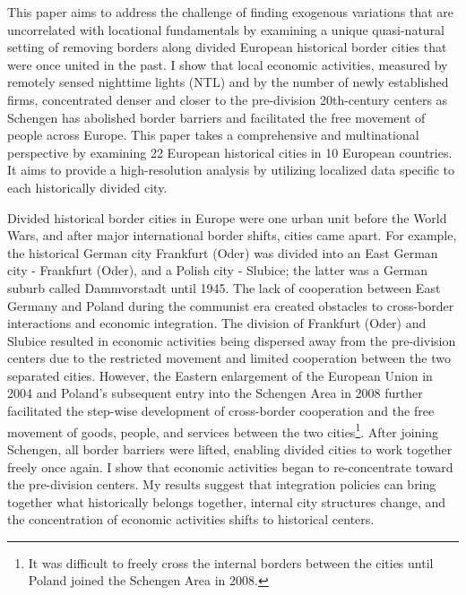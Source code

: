 \documentclass[12pt]{article}    %
\begin{document}
\par This paper aims to address the challenge of finding exogenous variations that are uncorrelated with locational fundamentals by examining a unique quasi-natural setting of removing borders along divided European historical border cities that were once united in the past. I show that local economic activities, measured by remotely sensed nighttime lights (NTL) and by the number of newly established firms, concentrated denser and closer to the pre-division 20th-century centers as Schengen has abolished border barriers and facilitated the free movement of people across Europe. This paper
takes a comprehensive and multinational perspective by examining 22 European historical cities in 10 European countries. It aims to provide a high-resolution analysis by utilizing localized data specific to each historically divided city.
 
\par Divided historical border cities in Europe were one urban unit before the World Wars, and after major international border shifts, cities came apart. For example, the historical German city Frankfurt (Oder) was divided into an East German city - Frankfurt (Oder), and a Polish city - Slubice; the latter was a German suburb called Dammvorstadt until 1945. The lack of cooperation between East Germany and Poland during the communist era created obstacles to cross-border interactions and economic integration. The division of Frankfurt (Oder) and Slubice resulted in economic activities being dispersed away from the pre-division centers due to the restricted movement and limited cooperation between the two separated cities. However, the Eastern enlargement of the European Union in 2004 and Poland's subsequent entry into the Schengen Area in 2008 further facilitated the step-wise development of cross-border cooperation and the free movement of goods, people, and services between the two cities\footnote{It was difficult to freely cross the internal borders between the cities until Poland joined the Schengen Area in  2008.}. After joining Schengen, all border barriers were lifted, enabling divided cities to work together freely once again. I show that economic activities began to re-concentrate toward the pre-division centers. My results suggest that integration policies can bring together what historically belongs together, internal city structures change, and the concentration of economic activities shifts to historical centers. 
\end{document}

